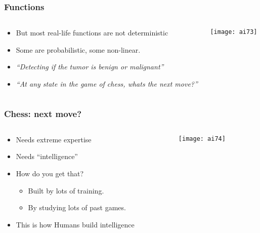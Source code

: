 \begin{frame}[fragile]\frametitle{Functions}

\begin{columns}
    \begin{column}[T]{0.6\linewidth}

\begin{itemize}
\item But most real-life functions are not deterministic
\item Some are probabilistic, some non-linear.
\item {\em ``Detecting if the tumor is benign or malignant''}
\item {\em ``At any state in the game of chess, whats the next move?''}
\end{itemize}

    \end{column}
    \begin{column}[T]{0.4\linewidth}

			\begin{center}
			\texttt{[image: ai73]}
			\end{center}
			
    \end{column}
  \end{columns}
  
  
  

\end{frame}

\begin{frame}[fragile]\frametitle{Chess: next move?}

\begin{columns}
    \begin{column}[T]{0.6\linewidth}

\begin{itemize}
\item Needs extreme expertise
\item Needs ``intelligence''
\item How do you get that?
\begin{itemize}
\item Built by lots of training.
\item By studying lots of past games.
\end{itemize}
\item This is how Humans build intelligence
\end{itemize}

    \end{column}
    \begin{column}[T]{0.4\linewidth}

			\begin{center}
			\texttt{[image: ai74]}
			\end{center}
			
    \end{column}
  \end{columns}
  
  

\end{frame}

